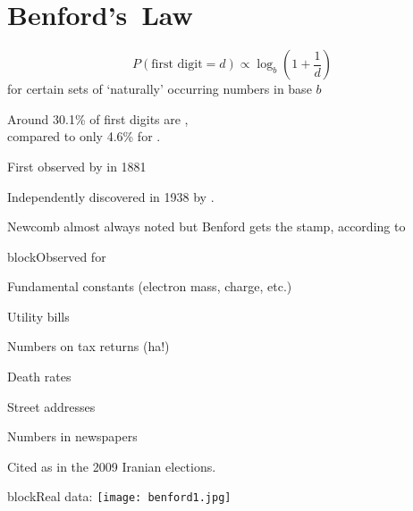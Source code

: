 
\section{Benford's\ Law}


  
    
     
      $$ 
      P(\mbox{first digit} = d) 
      \propto
      \log_b \left( 1 + \frac{1}{d} \right)
      $$
      for certain sets of `naturally' occurring numbers in base $b$
     
      Around 30.1\% of first digits are , \\
      compared to only 4.6\% for .
     
      First observed by \cite{newcomb1881a} in 1881\\
     
      Independently discovered in 1938 by .
    
      Newcomb almost always noted but Benford gets the stamp,
      according
      to 
    
  

{block}{Observed for}
    
    
        Fundamental constants (electron mass, charge, etc.)
    
        Utility bills 
    
        Numbers on tax returns (ha!)
    
        Death rates 
    
        Street addresses 
    
        Numbers in newspapers 
    
  

  
    
    
      Cited as 
      in the 2009 Iranian elections.
    
  

{block}{Real data:}
  \texttt{[image: benford1.jpg]}

